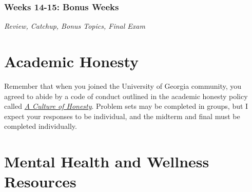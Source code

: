 \documentclass[11pt, letterpaper]{article}
\begin{document}
\subsubsection*{Weeks 14-15: Bonus Weeks}
\textit{Review, Catchup, Bonus Topics, Final Exam}







\section*{Academic Honesty}
Remember that when you joined the University of Georgia community, you agreed to abide by a code of conduct outlined in the academic honesty policy called \href{https://honesty.uga.edu/Academic-Honesty-Policy/Introduction/}{\textit{A Culture of Honesty}}. Problem sets may be completed in groups, but I expect your responses to be individual, and the midterm and final must be completed individually. 

\section*{Mental Health and Wellness Resources}
\end{document}
